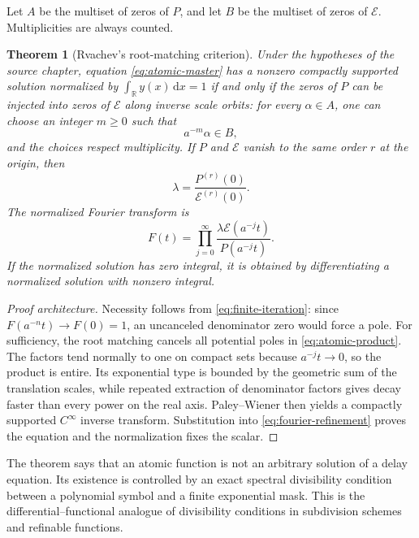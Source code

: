 \documentclass[11pt,oneside]{article}
\newtheorem{theorem}{Theorem}[section]
\theoremstyle{definition}
\theoremstyle{remark}
\newcommand{\R}{\mathbb{R}}
\newcommand{\dd}{\,\mathrm{d}}
\begin{document}
Let \(A\) be the multiset of zeros of \(P\), and let \(B\) be the multiset of zeros of \(\mathcal E\).  Multiplicities are always counted.

\begin{theorem}[Rvachev's root-matching criterion]
\label{thm:root-matching}
Under the hypotheses of the source chapter, equation \eqref{eq:atomic-master} has a nonzero compactly supported solution normalized by
\(\int_{\R}y(x)\dd x=1\) if and only if the zeros of \(P\) can be injected into zeros of \(\mathcal E\) along inverse scale orbits: for every \(\alpha\in A\), one can choose an integer \(m\ge0\) such that
\begin{equation}
  a^{-m}\alpha\in B,
  \label{eq:root-match}
\end{equation}
and the choices respect multiplicity.  If \(P\) and \(\mathcal E\) vanish to the same order \(r\) at the origin, then
\begin{equation}
  \lambda=\frac{P^{(r)}(0)}{\mathcal E^{(r)}(0)}.
  \label{eq:lambda-origin}
\end{equation}
The normalized Fourier transform is
\begin{equation}
  F(t)=\prod_{j=0}^{\infty}
  \frac{\lambda\mathcal E(a^{-j}t)}{P(a^{-j}t)}.
  \label{eq:atomic-product}
\end{equation}
If the normalized solution has zero integral, it is obtained by differentiating a normalized solution with nonzero integral.
\end{theorem}

\begin{proof}[Proof architecture]
Necessity follows from \eqref{eq:finite-iteration}: since \(F(a^{-n}t)\to F(0)=1\), an uncanceled denominator zero would force a pole.  For sufficiency, the root matching cancels all potential poles in \eqref{eq:atomic-product}.  The factors tend normally to one on compact sets because \(a^{-j}t\to0\), so the product is entire.  Its exponential type is bounded by the geometric sum of the translation scales, while repeated extraction of denominator factors gives decay faster than every power on the real axis.  Paley--Wiener then yields a compactly supported \(C^\infty\) inverse transform.  Substitution into \eqref{eq:fourier-refinement} proves the equation and the normalization fixes the scalar.
\end{proof}

The theorem says that an atomic function is not an arbitrary solution of a delay equation.  Its existence is controlled by an exact spectral divisibility condition between a polynomial symbol and a finite exponential mask.  This is the differential--functional analogue of divisibility conditions in subdivision schemes and refinable functions.
\end{document}
